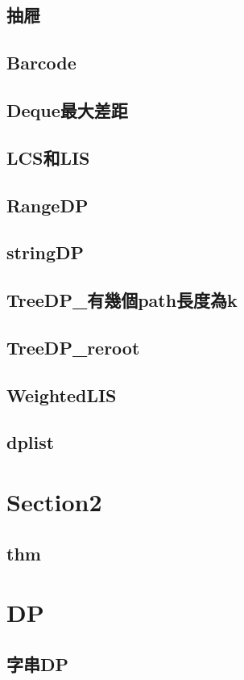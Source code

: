     \subsection{抽屜}
        
    \subsection{Barcode}
        
    \subsection{Deque最大差距}
        
    \subsection{LCS和LIS}
        
    \subsection{RangeDP}
        
    \subsection{stringDP}
        
    \subsection{TreeDP_有幾個path長度為k}
        
    \subsection{TreeDP_reroot}
        
    \subsection{WeightedLIS}
        
    \subsection{dplist}
        
    

\section{Section2}
    \subsection{thm}
        

\section{DP}
    \subsection{字串DP}
        

  